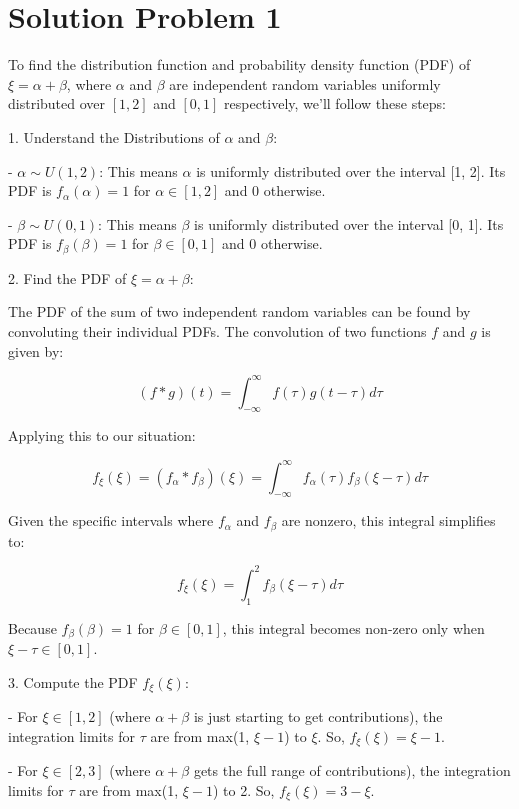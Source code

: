 \section*{Solution Problem 1}

To find the distribution function and probability density function (PDF) of \(\xi = \alpha + \beta\), where \(\alpha\) and \(\beta\) are independent random variables uniformly distributed over \([1, 2]\) and \([0, 1]\) respectively, we'll follow these steps:

1. Understand the Distributions of \(\alpha\) and \(\beta\):

- \(\alpha \sim U(1, 2)\): This means \(\alpha\) is uniformly distributed over the interval [1, 2]. Its PDF is \(f_{\alpha}(\alpha) = 1\) for \(\alpha \in [1, 2]\) and 0 otherwise.

- \(\beta \sim U(0, 1)\): This means \(\beta\) is uniformly distributed over the interval [0, 1]. Its PDF is \(f_{\beta}(\beta) = 1\) for \(\beta \in [0, 1]\) and 0 otherwise.

2. Find the PDF of \(\xi = \alpha + \beta\):

The PDF of the sum of two independent random variables can be found by convoluting their individual PDFs. The convolution of two functions \(f\) and \(g\) is given by:

\[ (f * g)(t) = \int_{-\infty}^{\infty} f(\tau)g(t - \tau) d\tau \]

Applying this to our situation:

\[ f_{\xi}(\xi) = (f_{\alpha} * f_{\beta})(\xi) = \int_{-\infty}^{\infty} f_{\alpha}(\tau)f_{\beta}(\xi - \tau) d\tau \]

Given the specific intervals where \(f_{\alpha}\) and \(f_{\beta}\) are nonzero, this integral simplifies to:

\[ f_{\xi}(\xi) = \int_{1}^{2} f_{\beta}(\xi - \tau) d\tau \]

Because \(f_{\beta}(\beta) = 1\) for \(\beta \in [0, 1]\), this integral becomes non-zero only when \(\xi - \tau \in [0, 1]\).

3. Compute the PDF \(f_{\xi}(\xi)\):

- For \(\xi \in [1, 2]\) (where \(\alpha + \beta\) is just starting to get contributions), the integration limits for \(\tau\) are from max(1, \(\xi - 1\)) to \(\xi\). So, \(f_{\xi}(\xi) = \xi - 1\).

- For \(\xi \in [2, 3]\) (where \(\alpha + \beta\) gets the full range of contributions), the integration limits for \(\tau\) are from max(1, \(\xi - 1\)) to 2. So, \(f_{\xi}(\xi) = 3 - \xi\).

